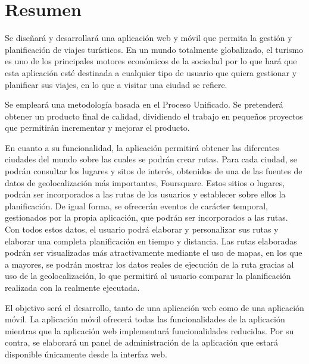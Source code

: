 \newpage
\chapter*{Resumen}
Se diseñará y desarrollará una aplicación web y móvil que permita la gestión y planificación de viajes turísticos. En un mundo totalmente globalizado, el turismo es uno de los principales motores económicos de la sociedad por lo que hará que esta aplicación esté destinada a cualquier tipo de usuario que quiera gestionar y planificar sus viajes, en lo que a visitar una ciudad se refiere.

Se empleará una metodología basada en el Proceso Unificado. Se pretenderá obtener un producto final de calidad, dividiendo el trabajo en pequeños proyectos que permitirán incrementar y mejorar el producto.

En cuanto a su funcionalidad, la aplicación permitirá obtener las diferentes ciudades del mundo sobre las cuales se podrán crear rutas. Para cada ciudad, se podrán consultar los lugares y sitos de interés, obtenidos de una de las fuentes de datos de geolocalización más importantes, Foursquare. Estos sitios o lugares, podrán ser incorporados a las rutas de los usuarios y establecer sobre ellos la planificación. De igual forma, se ofrecerán eventos de carácter temporal, gestionados por la propia aplicación, que podrán ser incorporados a las rutas. Con todos estos datos, el usuario podrá elaborar y personalizar sus rutas y elaborar una completa planificación en tiempo y distancia. Las rutas elaboradas podrán ser visualizadas más atractivamente mediante el uso de mapas, en los que a mayores, se podrán mostrar los datos reales de ejecución de la ruta gracias al uso de la geolocalización, lo que permitirá al usuario comparar la planificación realizada con la realmente ejecutada.

El objetivo será el desarrollo, tanto de una aplicación web como de una aplicación móvil. La aplicación móvil ofrecerá todas las funcionalidades de la aplicación mientras que la aplicación web implementará funcionalidades reducidas. Por su contra, se elaborará un panel de administración de la aplicación que estará disponible únicamente desde la interfaz web.